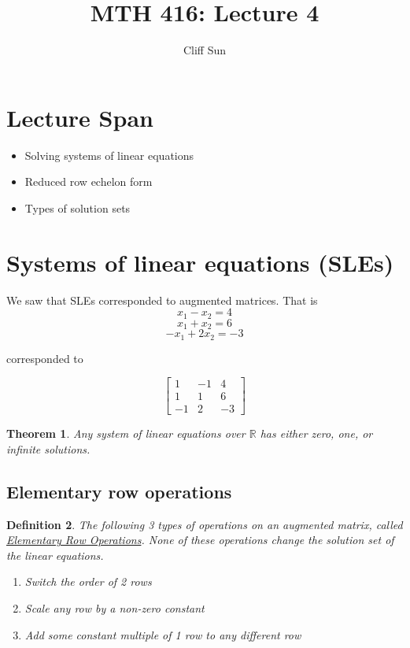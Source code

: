 \documentclass{article}
\title{MTH 416: Lecture 4}
\author{Cliff Sun}
\newtheorem{theorem}{Theorem}[section]
\newtheorem{definition}[theorem]{Definition}
\newtheorem{one minute paper}[theorem]{One Minute Paper}
\begin{document}
\maketitle

\section*{Lecture Span}
\begin{itemize}
    \item Solving systems of linear equations
    \item Reduced row echelon form
    \item Types of solution sets
\end{itemize}

\section*{Systems of linear equations (SLEs)}

We saw that SLEs corresponded to augmented matrices. That is
\begin{equation}
    x_1 - x_2 = 4
\end{equation}
\begin{equation}
    x_1 + x_2 = 6
\end{equation}
\begin{equation}
    -x_1 + 2x_2 = -3
\end{equation}

corresponded to 

\[
\left[
\begin{array}{cc|c}
    1 & -1 & 4 \\
    1 & 1 & 6 \\
    -1 & 2 & -3
\end{array}
\right]    
\]

\begin{theorem}
    Any system of linear equations over $\mathbb{R}$ has either zero, one, or infinite solutions. 
\end{theorem}

\subsection*{Elementary row operations}

\begin{definition}
    The following 3 types of operations on an augmented matrix, called \underline{Elementary Row Operations}. None of these operations
    change the solution set of the linear equations. 
    \begin{enumerate}
        \item Switch the order of 2 rows
        \item Scale any row by a non-zero constant
        \item Add some constant multiple of 1 row to any different row
    \end{enumerate}
\end{definition}
\end{document}
